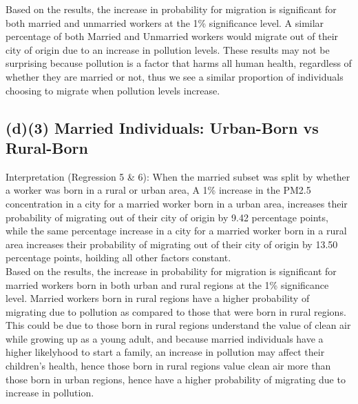 \documentclass[11pt]{article}
\begin{document}
\noindent Based on the results, the increase in probability for migration is significant for both married and unmarried workers at the 1\% significance level. A similar percentage of both Married and Unmarried workers would migrate out of their city of origin due to an increase in pollution levels. These results may not be surprising because pollution is a factor that harms all human health, regardless of whether they are married or not, thus we see a similar proportion of individuals choosing to migrate when pollution levels increase.  

\subsection*{(d)(3) Married Individuals: Urban-Born vs Rural-Born}

\noindent Interpretation (Regression 5 \& 6): When the married subset was split by whether a worker was born in a rural or urban area, A 1\% increase in the PM2.5 concentration in a city for a married worker born in a urban area, increases their probability of migrating out of their city of origin by 9.42 percentage points, while the same percentage increase in a city for a married worker born in a rural area increases their probability of migrating out of their city of origin by 13.50 percentage points, hoilding all other factors constant.\\

\noindent Based on the results, the increase in probability for migration is significant for married workers born in both urban and rural regions at the 1\% significance level. Married workers born in rural regions have a higher probability of migrating due to pollution as compared to those that were born in rural regions. This could be due to those born in rural regions understand the value of clean air while growing up as a young adult, and because 
married individuals have a higher likelyhood to start a family, an increase in pollution may affect their children's health, hence those born in rural regions value clean air more than those born in urban regions, hence have a higher probability of migrating due to increase in pollution.
\end{document}
